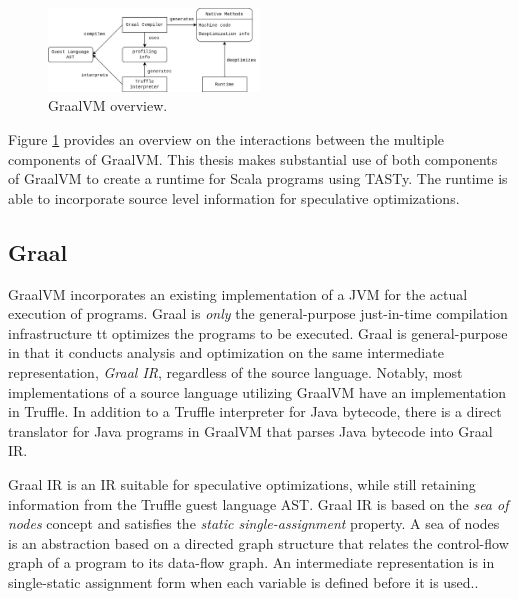 \begin{figure}[!htb]
	\centering
	\includegraphics[width=0.5\textwidth]{figures/graalvm-pipeline.png}
	\caption{GraalVM overview\cite{graalvm:ir}.}
	\label{figure:graalvm-overview}
\end{figure}

Figure \ref{figure:graalvm-overview} provides an overview on the interactions between the multiple components of GraalVM.
This thesis makes substantial use of both components of GraalVM to create a runtime for Scala programs using TASTy.
The runtime is able to incorporate source level information for speculative optimizations.

\subsection{Graal}

GraalVM incorporates an existing implementation of a JVM\cite{java:hotspot} for the actual execution of programs.
Graal is \textit{only} the general-purpose just-in-time compilation infrastructure tt optimizes the programs to be executed.
Graal is general-purpose in that it conducts analysis and optimization on the same intermediate representation, \textit{Graal IR}, regardless of the source language.
Notably, most implementations of a source language utilizing GraalVM have an implementation in Truffle.
In addition to a Truffle interpreter for Java bytecode\cite{graalvm:espresso}, there is a direct translator for Java programs in GraalVM that parses Java bytecode into Graal IR.

Graal IR\cite{graalvm:ir} is an IR suitable for speculative optimizations, while still retaining information from the Truffle guest language AST.
Graal IR is based on the \textit{sea of nodes} concept\cite{click:sea-of-nodes} and satisfies the \textit{static single-assignment}\cite{ssa} property.
A sea of nodes is an abstraction based on a directed graph structure that relates the control-flow graph\cite{allen:ctrl-flow-analysis} of a program to its data-flow graph\cite{allen:data-flow-analysis}.
An intermediate representation is in single-static assignment form when each variable is defined before it is used.\cite{johnson:use-def-chains}.

